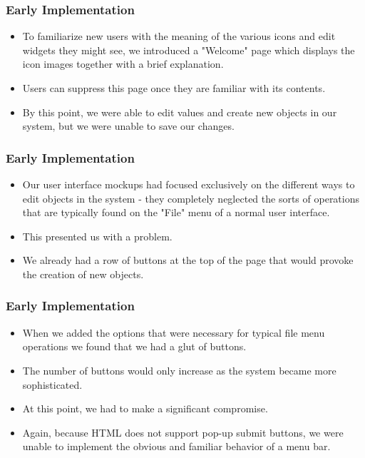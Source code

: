 \documentclass{beamer}
\begin{document}
\begin{frame}
\frametitle{Early Implementation}

\begin{itemize}
\item To familiarize new users with the meaning of the various icons and edit widgets they might see, we introduced a "Welcome" page which displays the icon images together with a brief explanation.
\item Users can suppress this page once they are familiar with its contents.
\item By this point, we were able to edit values and create new objects in our system, but we were unable to save our changes.
\end{itemize}

\end{frame}

\begin{frame}
\frametitle{Early Implementation}

\begin{itemize}
\item Our user interface mockups had focused exclusively on the different ways to edit objects in the system - they completely neglected the sorts of operations that are typically found on the "File" menu of a normal user interface.
\item This presented us with a problem.
\item We already had a row of buttons at the top of the page that would provoke the creation of new objects.
\end{itemize}

\end{frame}

\begin{frame}
\frametitle{Early Implementation}

\begin{itemize}
\item When we added the options that were necessary for typical file menu operations we found that we had a glut of buttons.
\item The number of buttons would only increase as the system became more sophisticated.
\item At this point, we had to make a significant compromise.
\item Again, because HTML does not support pop-up submit buttons, we were unable to implement the obvious and familiar behavior of a menu bar.
\end{itemize}

\end{frame}
\end{document}
